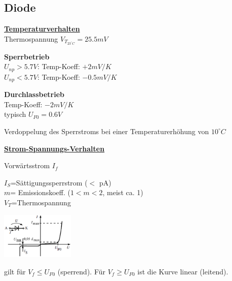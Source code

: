 \subsection{Diode}
  \underline{\bf Temperaturverhalten}\\
  Thermospannung
  \hspace{15.3mm} $V_{T_{23^\circ C}} = 25.5 mV$ \\
  \begin{minipage}[T]{8cm}
    {\bf Sperrbetrieb}\\
    $U_{np} > 5.7V$: Temp-Koeff: $+2 mV/K$\\
    $U_{np} < 5.7V$: Temp-Koeff: $-0.5 mV/K$\\
  \end{minipage}
  \begin{minipage}{5cm}
    {\bf Durchlassbetrieb}\\
    Temp-Koeff: $-2 mV/K$\\
    typisch $U_{F0} = 0.6V$
  \end{minipage}
  \begin{minipage}{6cm}
    Verdoppelung des Sperrstroms bei einer Temperaturerhöhung von $10^\circ C$
  \end{minipage}
            
  \underline{\bf Strom-Spannungs-Verhalten}\\
  \begin{minipage}[T]{8.5cm}
    Vorw\"artsstrom $I_f$
    \hspace{14.6mm}\\
  \end{minipage}
  \begin{minipage}{7cm}
    $I_S$=S\"attigungssperrstrom ($<$ pA)\\
    $m$= Emissionskoeff. ($1<m<2$, meist ca. 1)\\
    $V_T$=Thermospannung
  \end{minipage}
  \begin{minipage}{3.5cm}
    \includegraphics[width=3.5cm]{./bilder/IU_Kennlinie_Diode}\\
  \end{minipage}
  gilt für $V_f \leq U_{F0}$ (sperrend). Für $V_f \geq U_{F0}$ ist die Kurve linear (leitend).\\

